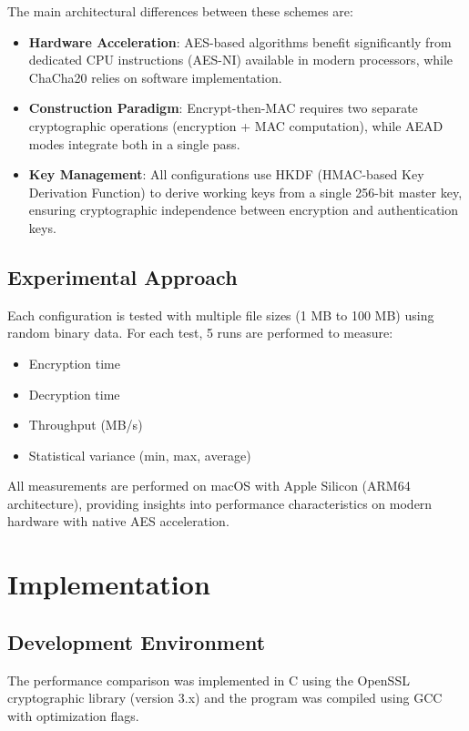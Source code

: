\documentclass[12pt,a4paper]{article}
\begin{document}
The main architectural differences between these schemes are:

\begin{itemize}
    \item \textbf{Hardware Acceleration}: AES-based algorithms benefit significantly from dedicated CPU instructions (AES-NI) available in modern processors, while ChaCha20 relies on software implementation.
    \item \textbf{Construction Paradigm}: Encrypt-then-MAC requires two separate cryptographic operations (encryption + MAC computation), while AEAD modes integrate both in a single pass.
    \item \textbf{Key Management}: All configurations use HKDF (HMAC-based Key Derivation Function) to derive working keys from a single 256-bit master key, ensuring cryptographic independence between encryption and authentication keys.
\end{itemize}

\subsection{Experimental Approach}

Each configuration is tested with multiple file sizes (1 MB to 100 MB) using random binary data. For each test, 5 runs are performed to measure:
\begin{itemize}
    \item Encryption time
    \item Decryption time  
    \item Throughput (MB/s)
    \item Statistical variance (min, max, average)
\end{itemize}

All measurements are performed on macOS with Apple Silicon (ARM64 architecture), providing insights into performance characteristics on modern hardware with native AES acceleration.

\newpage

\section{Implementation}

\subsection{Development Environment}
The performance comparison was implemented in C using the OpenSSL cryptographic library (version 3.x) and the program was compiled using GCC with optimization flags.
\end{document}
